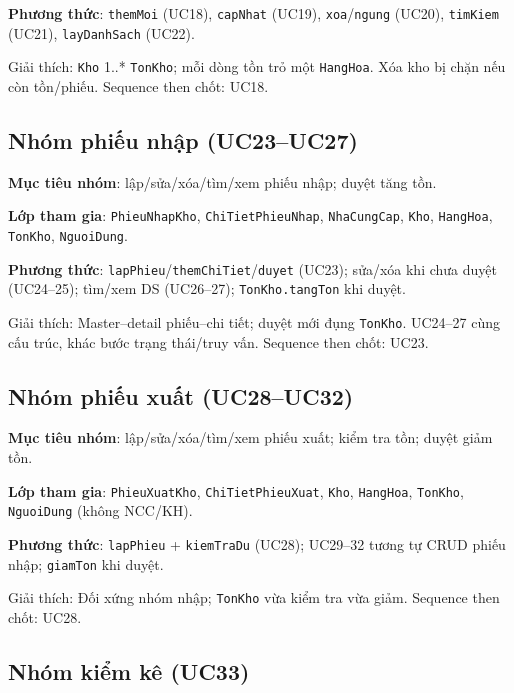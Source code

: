 \textbf{Phương thức}: \texttt{themMoi} (UC18), \texttt{capNhat} (UC19), \texttt{xoa}/\texttt{ngung} (UC20), \texttt{timKiem} (UC21), \texttt{layDanhSach} (UC22).



Giải thích: \texttt{Kho} 1..* \texttt{TonKho}; mỗi dòng tồn trỏ một \texttt{HangHoa}. Xóa kho bị chặn nếu còn tồn/phiếu. Sequence then chốt: UC18.

\subsection{Nhóm phiếu nhập (UC23--UC27)}

\textbf{Mục tiêu nhóm}: lập/sửa/xóa/tìm/xem phiếu nhập; duyệt tăng tồn.

\textbf{Lớp tham gia}: \texttt{PhieuNhapKho}, \texttt{ChiTietPhieuNhap}, \texttt{NhaCungCap}, \texttt{Kho}, \texttt{HangHoa}, \texttt{TonKho}, \texttt{NguoiDung}.

\textbf{Phương thức}: \texttt{lapPhieu}/\texttt{themChiTiet}/\texttt{duyet} (UC23); sửa/xóa khi chưa duyệt (UC24--25); tìm/xem DS (UC26--27); \texttt{TonKho.tangTon} khi duyệt.



Giải thích: Master--detail phiếu--chi tiết; duyệt mới đụng \texttt{TonKho}. UC24--27 cùng cấu trúc, khác bước trạng thái/truy vấn. Sequence then chốt: UC23.

\subsection{Nhóm phiếu xuất (UC28--UC32)}

\textbf{Mục tiêu nhóm}: lập/sửa/xóa/tìm/xem phiếu xuất; kiểm tra tồn; duyệt giảm tồn.

\textbf{Lớp tham gia}: \texttt{PhieuXuatKho}, \texttt{ChiTietPhieuXuat}, \texttt{Kho}, \texttt{HangHoa}, \texttt{TonKho}, \texttt{NguoiDung} (không NCC/KH).

\textbf{Phương thức}: \texttt{lapPhieu} + \texttt{kiemTraDu} (UC28); UC29--32 tương tự CRUD phiếu nhập; \texttt{giamTon} khi duyệt.



Giải thích: Đối xứng nhóm nhập; \texttt{TonKho} vừa kiểm tra vừa giảm. Sequence then chốt: UC28.

\subsection{Nhóm kiểm kê (UC33)}

